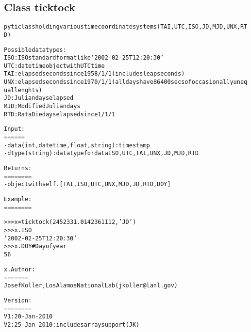 
\subsection{Class ticktock}

    \label{spacepy:ticktock:ticktock}
\begin{alltt}

    pyti class holding various time coordinate systems (TAI, UTC, ISO, JD, MJD, UNX, RTD)

    Possible data types:
    ISO: ISO standard format like '2002-02-25T12:20:30'
    UTC: datetime object with UTC time
    TAI: elapsed seconds since 1958/1/1 (includes leap seconds)
    UNX: elapsed seconds since 1970/1/1 (all days have 86400 secs of occasionally unequal lenghts)
    JD: Julian days elapsed
    MJD: Modified Julian days
    RTD: Rata Die days elapsed since 1/1/1

    Input:
    ======
        - data (int, datetime, float, string) : time stamp
        - dtype (string) : data type for data ISO, UTC, TAI, UNX, JD, MJD, RTD

    Returns:
    ========
        - object with self.[TAI, ISO, UTC, UNX, MJD, JD, RTD, DOY] 

    Example:
    ========

    {\textgreater}{\textgreater}{\textgreater} x=ticktock(2452331.0142361112, 'JD')
    {\textgreater}{\textgreater}{\textgreater} x.ISO
    '2002-02-25T12:20:30'
    {\textgreater}{\textgreater}{\textgreater} x.DOY \# Day of year
    56

x.    Author:
    =======
    Josef Koller, Los Alamos National Lab (jkoller@lanl.gov)

    Version:
    ========
    V1: 20-Jan-2010
    V2: 25-Jan-2010: includes array support (JK)
    
\end{alltt}



